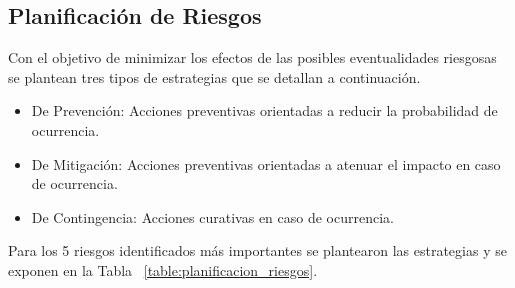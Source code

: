 \subsection{Planificación de Riesgos}
Con el objetivo de minimizar los efectos de las posibles eventualidades riesgosas se plantean tres tipos de estrategias que se detallan a continuación.

\begin{itemize}
	\item De Prevención: Acciones preventivas orientadas a reducir la probabilidad de ocurrencia.
	\item De Mitigación: Acciones preventivas orientadas a atenuar el impacto en caso de ocurrencia.
	\item De Contingencia: Acciones curativas en caso de ocurrencia.
\end{itemize}

Para los 5 riesgos identificados más importantes se plantearon las estrategias y se exponen en la Tabla ~\ref{table:planificacion_riesgos}.

